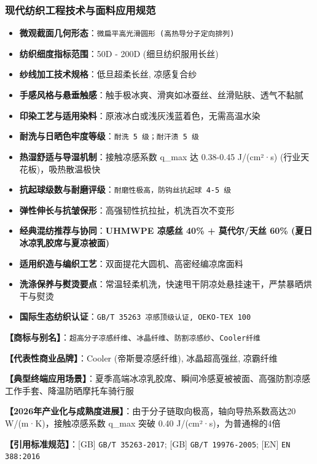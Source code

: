 \documentclass[11pt,openright,twoside,UTF8]{ctexbook}
\begin{document}
\subsubsection*{现代纺织工程技术与面料应用规范}
\begin{itemize} \setlength{\itemsep}{2pt}
    \item \textbf{微观截面几何形态}：\texttt{微扁平高光滑圆形 (高热导分子定向排列)}
    \item \textbf{纺织细度指标范围}：50D - 200D (细旦纺织服用长丝)
    \item \textbf{纱线加工技术规格}：低旦超柔长丝, 凉感复合纱
    \item \textbf{手感风格与悬垂触感}：触手极冰爽、滑爽如冰蚕丝、丝滑贴肤、透气不黏腻
    \item \textbf{印染工艺与适用染料}：原液冰白或浅灰浅蓝着色，无需高温水染
    \item \textbf{耐洗与日晒色牢度等级}：\texttt{耐洗 5 级；耐汗渍 5 级}
    \item \textbf{热湿舒适与导湿机制}：接触凉感系数 q\_max 达 0.38-0.45 J/(cm²·s) (行业天花板)，吸热散温极快
    \item \textbf{抗起球级数与耐磨评级}：\texttt{耐磨性极高，防钩丝抗起球 4-5 级}
    \item \textbf{弹性伸长与抗皱保形}：高强韧性抗拉扯，机洗百次不变形
    \item \textbf{经典混纺推荐与协同}：\textbf{UHMWPE 凉感丝 40\% + 莫代尔/天丝 60\% (夏日冰凉乳胶席与夏凉被面)}
    \item \textbf{适用织造与编织工艺}：双面提花大圆机、高密经编凉席面料
    \item \textbf{洗涤保养与熨烫要点}：常温轻柔机洗，快速甩干阴凉处悬挂速干，严禁暴晒烘干与熨烫
    \item \textbf{国际生态纺织认证}：\texttt{GB/T 35263 凉感顶级认证, OEKO-TEX 100}
\end{itemize}
\vspace{0.2cm}

\noindent\textbf{【商标与别名】}：\texttt{超高分子凉感纤维}、\texttt{冰晶纤维}、\texttt{防割凉感纱}、\texttt{Cooler纤维}\par
\noindent\textbf{【代表性商业品牌】}：Cooler (帝斯曼凉感纤维), 冰晶超高强丝, 凉霸纤维\par
\noindent\textbf{【典型终端应用场景】}：夏季高端冰凉乳胶席、瞬间冷感夏被被面、高强防割凉感工作手套、降温防晒摩托车骑行服\par
\noindent\textbf{【2026年产业化与成熟度进展】}：由于分子链取向极高，轴向导热系数高达20 W/(m·K)，接触凉感系数 q\_max 突破 0.40 J/(cm²·s)，为普通棉的4倍\par
\noindent\textbf{【引用标准规范】}：[GB] \texttt{GB/T 35263-2017}; [GB] \texttt{GB/T 19976-2005}; [EN] \texttt{EN 388:2016}\par
\vspace{0.5cm}
\end{document}
